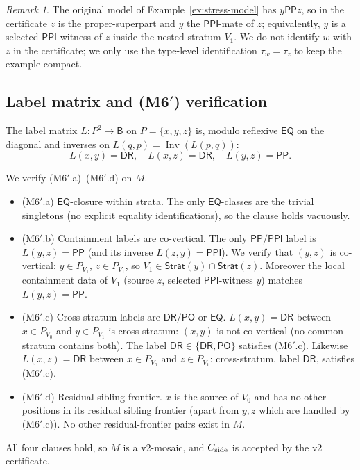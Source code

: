 \documentclass[11pt]{article}
\theoremstyle{definition}
\theoremstyle{remark}
\newtheorem{remark}[theorem]{Remark}
\newcommand{\DR}{\mathsf{DR}}
\newcommand{\PO}{\mathsf{PO}}
\newcommand{\PP}{\mathsf{PP}}
\newcommand{\PPI}{\mathsf{PPI}}
\newcommand{\EQ}{\mathsf{EQ}}
\newcommand{\Base}{\mathsf{B}}
\newcommand{\Inv}{\operatorname{Inv}}
\newcommand{\Stratum}{\mathsf{Strat}}
\begin{document}
\begin{remark}\label{rem:identify}
The original model of Example~\ref{ex:stress-model} has $y\PP z$, so
in the certificate $z$ is the proper-superpart and $y$ the
$\PPI$-mate of $z$; equivalently, $y$ is a selected $\PPI$-witness of
$z$ inside the nested stratum $V_1$.  We do not identify $w$ with $z$
in the certificate; we only use the type-level identification
$\tau_w=\tau_z$ to keep the example compact.
\end{remark}

\subsection{Label matrix and (M6$'$) verification}

The label matrix $L:P^2\to\Base$ on $P=\{x,y,z\}$ is, modulo
reflexive $\EQ$ on the diagonal and inverses on
$L(q,p)=\Inv(L(p,q))$:
\[
  L(x,y)=\DR,\quad L(x,z)=\DR,\quad L(y,z)=\PP.
\]

We verify (M6$'$.a)--(M6$'$.d) on $M$.
\begin{itemize}
\item (M6$'$.a) $\EQ$-closure within strata.  The only $\EQ$-classes
  are the trivial singletons (no explicit equality identifications),
  so the clause holds vacuously.
\item (M6$'$.b) Containment labels are co-vertical.  The only
  $\PP/\PPI$ label is $L(y,z)=\PP$ (and its inverse $L(z,y)=\PPI$).
  We verify that $(y,z)$ is co-vertical: $y\in P_{V_1}$, $z\in
  P_{V_1}$, so $V_1\in\Stratum(y)\cap\Stratum(z)$.  Moreover the
  local containment data of $V_1$ (source $z$, selected
  $\PPI$-witness $y$) matches $L(y,z)=\PP$.
\item (M6$'$.c) Cross-stratum labels are $\DR/\PO$ or $\EQ$.
  $L(x,y)=\DR$ between $x\in P_{V_0}$ and $y\in P_{V_1}$ is
  cross-stratum: $(x,y)$ is not co-vertical (no common stratum
  contains both).  The label $\DR\in\{\DR,\PO\}$ satisfies (M6$'$.c).
  Likewise $L(x,z)=\DR$ between $x\in P_{V_0}$ and $z\in P_{V_1}$:
  cross-stratum, label $\DR$, satisfies (M6$'$.c).
\item (M6$'$.d) Residual sibling frontier.  $x$ is the source of
  $V_0$ and has no other positions in its residual sibling frontier
  (apart from $y,z$ which are handled by (M6$'$.c)).  No other
  residual-frontier pairs exist in $M$.
\end{itemize}
All four clauses hold, so $M$ is a v2-mosaic, and $C_{\rm side}$ is
accepted by the v2 certificate.
\end{document}
